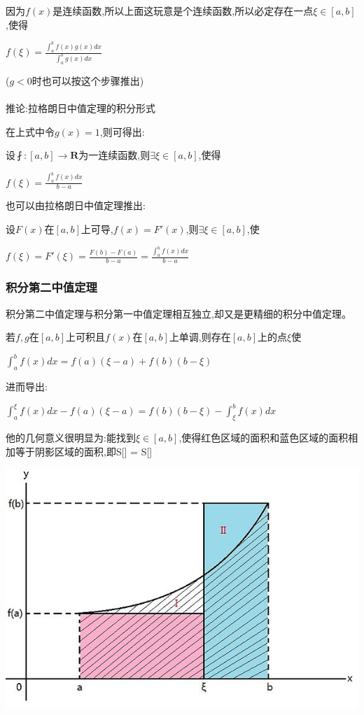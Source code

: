 \documentclass[UTF8]{ctexbook}
\newcommand{\defFunction}[1]{f(#1)}
\newcommand{\definiteIntegral}[2]{\int^{#1}_{#2}}
\begin{document}
{{{{因为$f(x)$是连续函数,所以上面这玩意是个连续函数,所以必定存在一点$\xi\in[a,b]$,使得

$\defFunction{\xi} = \frac{\definiteIntegral{b}{a}\defFunction{x}g(x)dx}{\definiteIntegral{b}{a}g(x)dx}$

($g<0$时也可以按这个步骤推出)
\\\\
推论:拉格朗日中值定理的积分形式

在上式中令$g(x) = 1$,则可得出:

设$\fint : [a,b] \to \mathbf{R}$为一连续函数,则$\exists\xi\in[a,b]$,使得

$\defFunction{\xi} = \frac{\definiteIntegral{b}{a}\defFunction{x}dx}{b - a}$

也可以由拉格朗日中值定理推出:

设$F(x)$在$[a,b]$上可导,$\defFunction{x} = F\prime(x)$,则$\exists\xi\in[a,b]$,使

$\defFunction{\xi} = F\prime(\xi) = \frac{F(b) - F(a)}{b - a} = \frac{\definiteIntegral{b}{a}\defFunction{x}dx}{b - a}$

}%

\subsubsection{积分第二中值定理}{

积分第二中值定理与积分第一中值定理相互独立,却又是更精细的积分中值定理。

若$f,g$在$[a,b]$上可积且$f(x)$在$[a,b]$上单调,则存在$[a,b]$上的点$\xi$使

$\definiteIntegral{b}{a}\defFunction{x}dx = \defFunction{a}(\xi - a) + \defFunction{b}(b - \xi)$

进而导出:

$\definiteIntegral{\xi}{a}\defFunction{x}dx -\defFunction{a}(\xi - a) = \defFunction{b}(b - \xi) - \definiteIntegral{b}{\xi}\defFunction{x}dx$

他的几何意义很明显为:能找到$\xi\in[a,b]$,使得红色区域的面积和蓝色区域的面积相加等于阴影区域的面积,即S[\uppercase\expandafter{}] = S[\uppercase\expandafter{}]

\includegraphics{resources/Geometric_explanation_of_the_second_mean_value_theorem_for_integration.jpg}

}}}}
\end{document}
